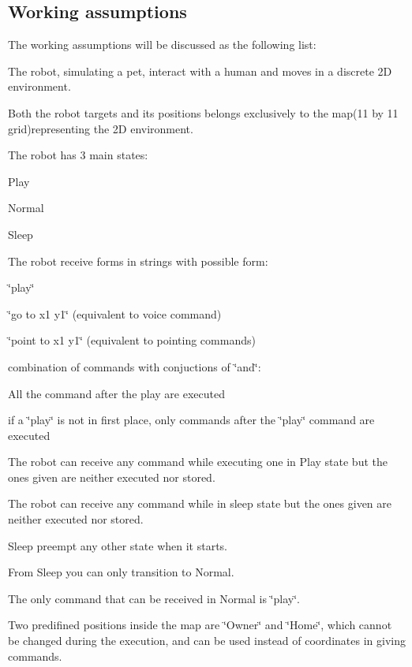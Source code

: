 \subsection*{Working assumptions}

The working assumptions will be discussed as the following list\+:
\begin{DoxyItemize}
\item The robot, simulating a pet, interact with a human and moves in a discrete 2D environment.
\item Both the robot targets and its positions belongs exclusively to the map(11 by 11 grid)representing the 2D environment.
\item The robot has 3 main states\+:
\begin{DoxyItemize}
\item Play
\item Normal
\item Sleep
\end{DoxyItemize}
\item The robot receive forms in strings with possible form\+:
\begin{DoxyItemize}
\item \char`\"{}play\char`\"{}
\item \char`\"{}go to x1 y1\char`\"{} (equivalent to voice command)
\item \char`\"{}point to x1 y1\char`\"{} (equivalent to pointing commands)
\item combination of commands with conjuctions of \char`\"{}and\char`\"{}\+:
\begin{DoxyItemize}
\item All the command after the play are executed
\item if a \char`\"{}play\char`\"{} is not in first place, only commands after the \char`\"{}play\char`\"{} command are executed
\end{DoxyItemize}
\end{DoxyItemize}
\item The robot can receive any command while executing one in Play state but the ones given are neither executed nor stored.
\item The robot can receive any command while in sleep state but the ones given are neither executed nor stored.
\item Sleep preempt any other state when it starts.
\item From Sleep you can only transition to Normal.
\item The only command that can be received in Normal is \char`\"{}play\char`\"{}.
\item Two predifined positions inside the map are \char`\"{}\+Owner\char`\"{} and \char`\"{}\+Home\char`\"{}, which cannot be changed during the execution, and can be used instead of coordinates in giving commands.
\end{DoxyItemize}

